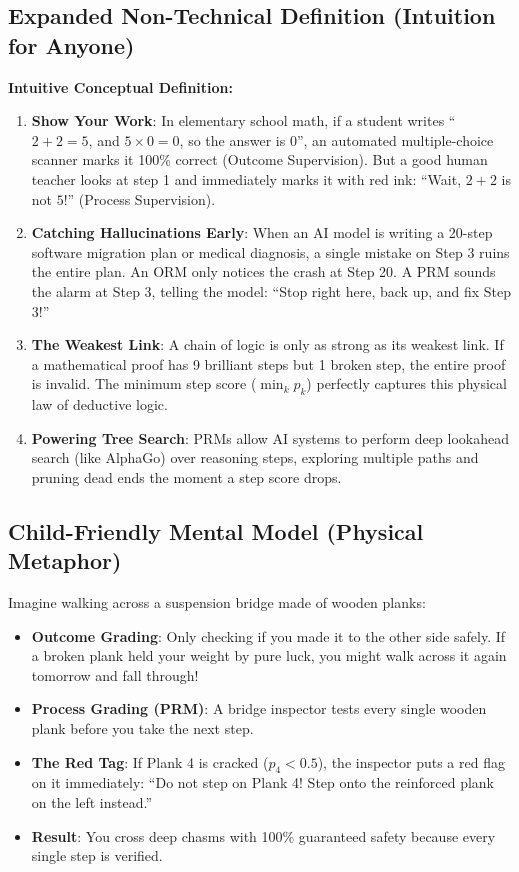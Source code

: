 \documentclass[11pt,a4paper]{article}
\theoremstyle{definition}
\begin{document}
\subsection{Expanded Non-Technical Definition (Intuition for Anyone)}
\textbf{Intuitive Conceptual Definition:}
\begin{enumerate}
    \item \textbf{Show Your Work}: In elementary school math, if a student writes ``$2 + 2 = 5$, and $5 \times 0 = 0$, so the answer is $0$'', an automated multiple-choice scanner marks it 100\% correct (Outcome Supervision). But a good human teacher looks at step 1 and immediately marks it with red ink: ``Wait, $2 + 2$ is not $5$!'' (Process Supervision).
    \item \textbf{Catching Hallucinations Early}: When an AI model is writing a 20-step software migration plan or medical diagnosis, a single mistake on Step 3 ruins the entire plan. An ORM only notices the crash at Step 20. A PRM sounds the alarm at Step 3, telling the model: ``Stop right here, back up, and fix Step 3!''
    \item \textbf{The Weakest Link}: A chain of logic is only as strong as its weakest link. If a mathematical proof has 9 brilliant steps but 1 broken step, the entire proof is invalid. The minimum step score ($\min_k p_k$) perfectly captures this physical law of deductive logic.
    \item \textbf{Powering Tree Search}: PRMs allow AI systems to perform deep lookahead search (like AlphaGo) over reasoning steps, exploring multiple paths and pruning dead ends the moment a step score drops.
\end{enumerate}

\subsection{Child-Friendly Mental Model (Physical Metaphor)}
Imagine walking across a suspension bridge made of wooden planks:
\begin{itemize}
    \item \textbf{Outcome Grading}: Only checking if you made it to the other side safely. If a broken plank held your weight by pure luck, you might walk across it again tomorrow and fall through!
    \item \textbf{Process Grading (PRM)}: A bridge inspector tests every single wooden plank before you take the next step.
    \item \textbf{The Red Tag}: If Plank 4 is cracked ($p_4 < 0.5$), the inspector puts a red flag on it immediately: ``Do not step on Plank 4! Step onto the reinforced plank on the left instead.''
    \item \textbf{Result}: You cross deep chasms with 100\% guaranteed safety because every single step is verified.
\end{itemize}
\end{document}
